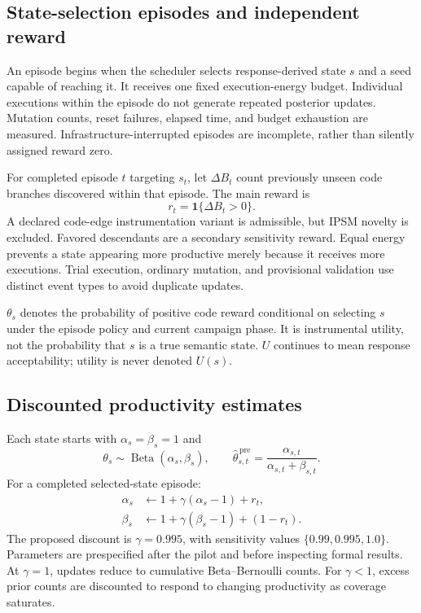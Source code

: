 \documentclass[final,5p,times,number]{elsarticle}
\begin{document}
\subsection{State-selection episodes and independent reward}
An episode begins when the scheduler selects response-derived state $s$ and a seed capable of reaching it. It receives one fixed execution-energy budget. Individual executions within the episode do not generate repeated posterior updates. Mutation counts, reset failures, elapsed time, and budget exhaustion are measured. Infrastructure-interrupted episodes are incomplete, rather than silently assigned reward zero.

For completed episode $t$ targeting $s_t$, let $\Delta B_t$ count previously unseen code branches discovered within that episode. The main reward is
\begin{equation}
r_t=\mathbf{1}\{\Delta B_t>0\}.
\label{eq:reward}
\end{equation}
A declared code-edge instrumentation variant is admissible, but IPSM novelty is excluded. Favored descendants are a secondary sensitivity reward. Equal energy prevents a state appearing more productive merely because it receives more executions. Trial execution, ordinary mutation, and provisional validation use distinct event types to avoid duplicate updates.

$\theta_s$ denotes the probability of positive code reward conditional on selecting $s$ under the episode policy and current campaign phase. It is instrumental utility, not the probability that $s$ is a true semantic state. $U$ continues to mean response acceptability; utility is never denoted $U(s)$.

\subsection{Discounted productivity estimates}
Each state starts with $\alpha_s=\beta_s=1$ and
\begin{equation}
\theta_s\sim\operatorname{Beta}(\alpha_s,\beta_s),\qquad
\widehat{\theta}_{s,t}^{\,\mathrm{pre}}
=\frac{\alpha_{s,t}}{\alpha_{s,t}+\beta_{s,t}}.
\end{equation}
For a completed selected-state episode:
\begin{align}
\alpha_s&\leftarrow1+\gamma(\alpha_s-1)+r_t,\\
\beta_s&\leftarrow1+\gamma(\beta_s-1)+(1-r_t).
\label{eq:update}
\end{align}
The proposed discount is $\gamma=0.995$, with sensitivity values $\{0.99,0.995,1.0\}$. Parameters are prespecified after the pilot and before inspecting formal results. At $\gamma=1$, updates reduce to cumulative Beta--Bernoulli counts. For $\gamma<1$, excess prior counts are discounted to respond to changing productivity as coverage saturates.
\end{document}
